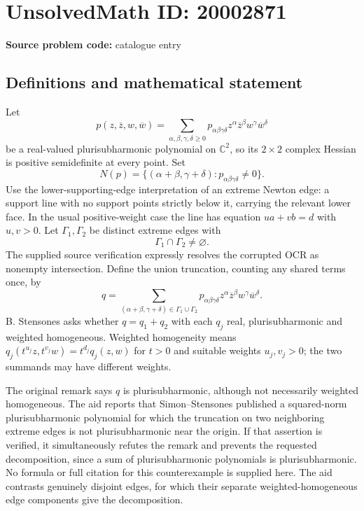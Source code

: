 \documentclass[11pt]{article}
\newcommand{\C}{\mathbb{C}}
\begin{document}
\section*{UnsolvedMath ID: 20002871}
\textbf{Source problem code:} catalogue entry
\subsection{Definitions and mathematical statement}
Let
\[
p(z,\overline z,w,\overline w)=\sum_{\alpha,\beta,\gamma,\delta\geq0}
p_{\alpha\beta\gamma\delta}z^\alpha\overline z^\beta w^\gamma\overline w^\delta
\]
be a real-valued plurisubharmonic polynomial on $\C^2$, so its $2\times2$ complex Hessian is positive semidefinite at every point. Set
\[
N(p)=\{(\alpha+\beta,\gamma+\delta):p_{\alpha\beta\gamma\delta}\ne0\}.
\]
Use the lower-supporting-edge interpretation of an extreme Newton edge: a support line with no support points strictly below it, carrying the relevant lower face. In the usual positive-weight case the line has equation $ua+vb=d$ with $u,v>0$. Let $\Gamma_1,\Gamma_2$ be distinct extreme edges with
\[
\Gamma_1\cap\Gamma_2\ne\varnothing.
\]
The supplied source verification expressly resolves the corrupted OCR as nonempty intersection. Define the union truncation, counting any shared terms once, by
\[
q=\sum_{(\alpha+\beta,\gamma+\delta)\in\Gamma_1\cup\Gamma_2}
p_{\alpha\beta\gamma\delta}z^\alpha\overline z^\beta w^\gamma\overline w^\delta.
\]
B. Stensones asks whether $q=q_1+q_2$ with each $q_j$ real, plurisubharmonic and weighted homogeneous. Weighted homogeneity means $q_j(t^{u_j}z,t^{v_j}w)=t^{d_j}q_j(z,w)$ for $t>0$ and suitable weights $u_j,v_j>0$; the two summands may have different weights.

The original remark says $q$ is plurisubharmonic, although not necessarily weighted homogeneous. The aid reports that Simon--Stensones published a squared-norm plurisubharmonic polynomial for which the truncation on two neighboring extreme edges is not plurisubharmonic near the origin. If that assertion is verified, it simultaneously refutes the remark and prevents the requested decomposition, since a sum of plurisubharmonic polynomials is plurisubharmonic. No formula or full citation for this counterexample is supplied here. The aid contrasts genuinely disjoint edges, for which their separate weighted-homogeneous edge components give the decomposition.
\end{document}
